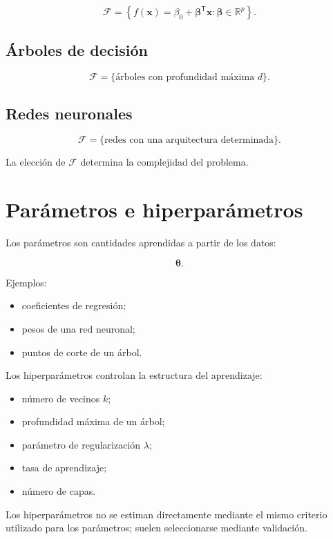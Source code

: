 \documentclass[
  spanish,
  11pt,
  letterpaper,
  DIV=11,
  numbers=noendperiod]{scrreprt}
\providecommand{\tightlist}{%
  \setlength{\itemsep}{0pt}\setlength{\parskip}{0pt}}
\theoremstyle{definition}
\theoremstyle{plain}
\theoremstyle{definition}
\theoremstyle{remark}
\begin{document}
\[
\mathcal{F}
=
\left\{
f(\mathbf{x})
=
\beta_0
+
\boldsymbol{\beta}^{\mathsf T}\mathbf{x}
:
\boldsymbol{\beta}\in\mathbb{R}^{p}
\right\}.
\]

\subsection{Árboles de decisión}\label{uxe1rboles-de-decisiuxf3n}

\[
\mathcal{F}
=
\{
\text{árboles con profundidad máxima }d
\}.
\]

\subsection{Redes neuronales}\label{redes-neuronales}

\[
\mathcal{F}
=
\{
\text{redes con una arquitectura determinada}
\}.
\]

La elección de \(\mathcal{F}\) determina la complejidad del problema.

\section{Parámetros e
hiperparámetros}\label{paruxe1metros-e-hiperparuxe1metros}

Los parámetros son cantidades aprendidas a partir de los datos:

\[
\boldsymbol{\theta}.
\]

Ejemplos:

\begin{itemize}
\tightlist
\item
  coeficientes de regresión;
\item
  pesos de una red neuronal;
\item
  puntos de corte de un árbol.
\end{itemize}

Los hiperparámetros controlan la estructura del aprendizaje:

\begin{itemize}
\tightlist
\item
  número de vecinos \(k\);
\item
  profundidad máxima de un árbol;
\item
  parámetro de regularización \(\lambda\);
\item
  tasa de aprendizaje;
\item
  número de capas.
\end{itemize}

Los hiperparámetros no se estiman directamente mediante el mismo
criterio utilizado para los parámetros; suelen seleccionarse mediante
validación.
\end{document}
